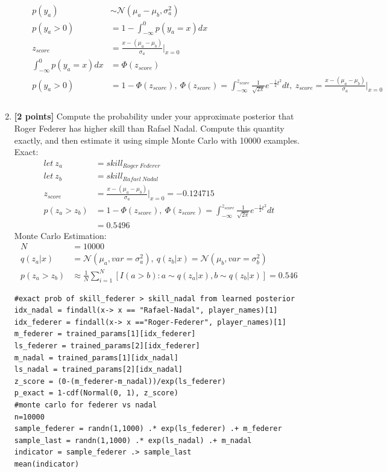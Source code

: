 \documentclass{article}
\newcommand{\N}{\mathcal{N}}
\begin{document}
\begin{enumerate}[label=(\alph*)]
\begin{itemize}
\begin{align*}
    p(y_a) &\sim \N(\mu_a-\mu_b,\sigma_a^2)\\
    p(y_a>0)&=1-\int_{-\infty}^0 p(y_a=x)dx\\
    z_{score} &= \frac{x-(\mu_a-\mu_b)}{\sigma_a}\bigg|_{x=0}\\
    \int_{-\infty}^0 p(y_a=x)dx &= \Phi(z_{score})\\
    p(y_a>0)&=1-\Phi(z_{score}),\ \Phi(z_{score}) = \int_{-\infty}^{z_{score}} \frac{1}{\sqrt{2\pi}} e^{-\frac{1}{2}t^2}dt,\ z_{score} = \frac{x-(\mu_a-\mu_b)}{\sigma_a}\bigg|_{x=0}\\\\
  \end{align*}
  \pagebreak
\end{itemize}
\item {\bf [2 points]} Compute the probability under your approximate posterior that
	Roger Federer has higher skill than Rafael Nadal.
	Compute this quantity exactly, and then estimate it using simple Monte Carlo with 10000 examples.\\
        Exact:
        \begin{align*}
          let\ z_a &= skill_{Roger\ Federer}\\
          let\ z_b &= skill_{Rafael\ Nadal}\\
          z_{score} &= \frac{x-(\mu_a-\mu_b)}{\sigma_a}\bigg|_{x=0}=-0.124715\\
          p(z_a>z_b)&=1-\Phi(z_{score}),\ \Phi(z_{score}) = \int_{-\infty}^{z_{score}} \frac{1}{\sqrt{2\pi}} e^{-\frac{1}{2}t^2}dt\\
                   & = 0.5496
        \end{align*}
        Monte Carlo Estimation:
        \begin{align*}
          N&=10000\\
          q(z_a|x) &= \N(\mu_a, var=\sigma_a^2),\ q(z_b|x) = \N(\mu_b, var=\sigma_b^2)\\
          p(z_a > z_b) &\approx \frac{1}{N} \sum_{i=1}^{N} [I(a>b) : a \sim q(z_a|x), b \sim q(z_b|x)] = 0.546
        \end{align*}
\begin{verbatim}
#exact prob of skill_federer > skill_nadal from learned posterior
idx_nadal = findall(x-> x == "Rafael-Nadal", player_names)[1]
idx_federer = findall(x-> x =="Roger-Federer", player_names)[1]
m_federer = trained_params[1][idx_federer]
ls_federer = trained_params[2][idx_federer]
m_nadal = trained_params[1][idx_nadal]
ls_nadal = trained_params[2][idx_nadal]
z_score = (0-(m_federer-m_nadal))/exp(ls_federer)
p_exact = 1-cdf(Normal(0, 1), z_score) 
#monte carlo for federer vs nadal
n=10000
sample_federer = randn(1,1000) .* exp(ls_federer) .+ m_federer
sample_last = randn(1,1000) .* exp(ls_nadal) .+ m_nadal
indicator = sample_federer .> sample_last
mean(indicator)
\end{verbatim}


\end{enumerate}
\end{document}
